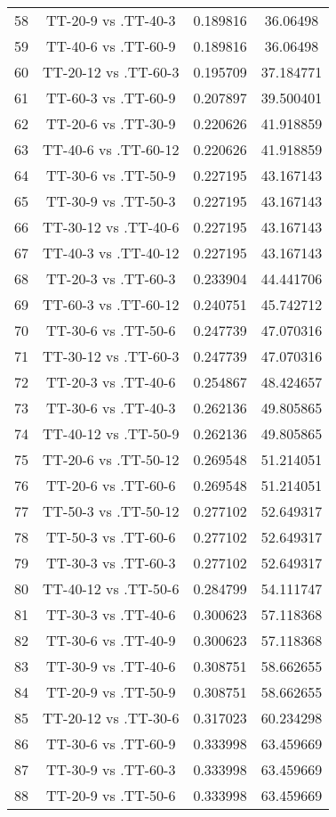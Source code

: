 \documentclass[a4paper,10pt]{article}
\begin{document}
\begin{landscape}
\begin{table}[!htp]
\begin{tabular}{cccc}
58&TT-20-9 vs .TT-40-3&0.189816&36.06498\\
59&TT-40-6 vs .TT-60-9&0.189816&36.06498\\
60&TT-20-12 vs .TT-60-3&0.195709&37.184771\\
61&TT-60-3 vs .TT-60-9&0.207897&39.500401\\
62&TT-20-6 vs .TT-30-9&0.220626&41.918859\\
63&TT-40-6 vs .TT-60-12&0.220626&41.918859\\
64&TT-30-6 vs .TT-50-9&0.227195&43.167143\\
65&TT-30-9 vs .TT-50-3&0.227195&43.167143\\
66&TT-30-12 vs .TT-40-6&0.227195&43.167143\\
67&TT-40-3 vs .TT-40-12&0.227195&43.167143\\
68&TT-20-3 vs .TT-60-3&0.233904&44.441706\\
69&TT-60-3 vs .TT-60-12&0.240751&45.742712\\
70&TT-30-6 vs .TT-50-6&0.247739&47.070316\\
71&TT-30-12 vs .TT-60-3&0.247739&47.070316\\
72&TT-20-3 vs .TT-40-6&0.254867&48.424657\\
73&TT-30-6 vs .TT-40-3&0.262136&49.805865\\
74&TT-40-12 vs .TT-50-9&0.262136&49.805865\\
75&TT-20-6 vs .TT-50-12&0.269548&51.214051\\
76&TT-20-6 vs .TT-60-6&0.269548&51.214051\\
77&TT-50-3 vs .TT-50-12&0.277102&52.649317\\
78&TT-50-3 vs .TT-60-6&0.277102&52.649317\\
79&TT-30-3 vs .TT-60-3&0.277102&52.649317\\
80&TT-40-12 vs .TT-50-6&0.284799&54.111747\\
81&TT-30-3 vs .TT-40-6&0.300623&57.118368\\
82&TT-30-6 vs .TT-40-9&0.300623&57.118368\\
83&TT-30-9 vs .TT-40-6&0.308751&58.662655\\
84&TT-20-9 vs .TT-50-9&0.308751&58.662655\\
85&TT-20-12 vs .TT-30-6&0.317023&60.234298\\
86&TT-30-6 vs .TT-60-9&0.333998&63.459669\\
87&TT-30-9 vs .TT-60-3&0.333998&63.459669\\
88&TT-20-9 vs .TT-50-6&0.333998&63.459669\\

\end{tabular}
\end{table}
\end{landscape}
\end{document}
